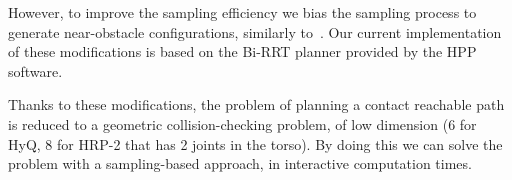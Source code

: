 However, to improve the sampling efficiency 
we bias the sampling process to generate near-obstacle configurations, similarly to~\cite{Amato98choosinggood}.
Our current implementation of these modifications is based on the Bi-RRT planner \citep{770022} provided by the HPP software.

Thanks to these modifications, the problem of planning a \gls{contact reachable} path is reduced to a geometric collision-checking problem, of low dimension (6 for HyQ, 8 for HRP-2 that has 2 joints in the torso). By doing this we can solve the problem with a sampling-based approach, in \gls{interactive} computation times.
